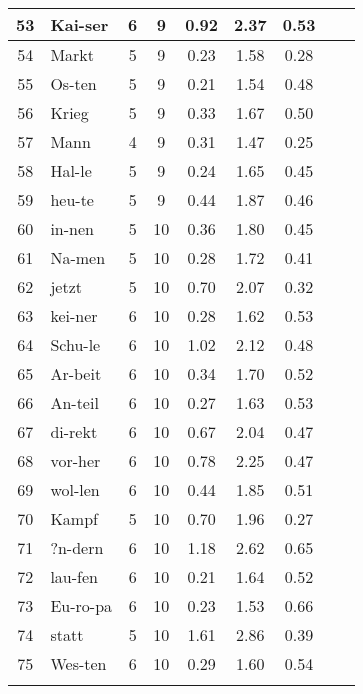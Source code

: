 {\begin{longtable}{clccccccc}
53 & Kai-ser & 6 & 9 & 0.92 & 2.37 & 0.53 \\ \hline
54 & Markt & 5 & 9 & 0.23 & 1.58 & 0.28 \\ \hline
55 & Os-ten & 5 & 9 & 0.21 & 1.54 & 0.48 \\ \hline
56 & Krieg & 5 & 9 & 0.33 & 1.67 & 0.50 \\ \hline
57 & Mann & 4 & 9 & 0.31 & 1.47 & 0.25 \\ \hline
58 & Hal-le & 5 & 9 & 0.24 & 1.65 & 0.45 \\ \hline
59 & heu-te & 5 & 9 & 0.44 & 1.87 & 0.46 \\ \hline
60 & in-nen & 5 & 10 & 0.36 & 1.80 & 0.45 \\ \hline
61 & Na-men & 5 & 10 & 0.28 & 1.72 & 0.41 \\ \hline
62 & jetzt & 5 & 10 & 0.70 & 2.07 & 0.32 \\ \hline
63 & kei-ner & 6 & 10 & 0.28 & 1.62 & 0.53 \\ \hline
64 & Schu-le & 6 & 10 & 1.02 & 2.12 & 0.48 \\ \hline
65 & Ar-beit & 6 & 10 & 0.34 & 1.70 & 0.52 \\ \hline
66 & An-teil & 6 & 10 & 0.27 & 1.63 & 0.53 \\ \hline
67 & di-rekt & 6 & 10 & 0.67 & 2.04 & 0.47 \\ \hline
68 & vor-her & 6 & 10 & 0.78 & 2.25 & 0.47 \\ \hline
69 & wol-len & 6 & 10 & 0.44 & 1.85 & 0.51 \\ \hline
70 & Kampf & 5 & 10 & 0.70 & 1.96 & 0.27 \\ \hline
71 & ?n-dern & 6 & 10 & 1.18 & 2.62 & 0.65 \\ \hline
72 & lau-fen & 6 & 10 & 0.21 & 1.64 & 0.52 \\ \hline
73 & Eu-ro-pa & 6 & 10 & 0.23 & 1.53 & 0.66 \\ \hline
74 & statt & 5 & 10 & 1.61 & 2.86 & 0.39 \\ \hline
75 & Wes-ten & 6 & 10 & 0.29 & 1.60 & 0.54 \\
\bottomrule
\label{tab:wordlist}
\end{longtable}
}